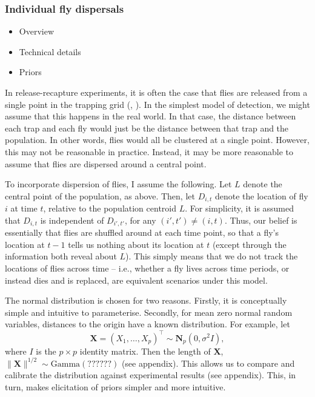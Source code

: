 \documentclass[
]{book}
\providecommand{\tightlist}{%
  \setlength{\itemsep}{0pt}\setlength{\parskip}{0pt}}
\begin{document}
\hypertarget{individual-fly-dispersals}{%
\subsubsection{Individual fly dispersals}\label{individual-fly-dispersals}}

\begin{itemize}
\tightlist
\item
  Overview
\item
  Technical details
\item
  Priors
\end{itemize}

In release-recapture experiments, it is often the case that flies are released from a single point in the trapping grid (\citet{lg2004}, \citet{wong1982}). In the simplest model of detection, we might assume that this happens in the real world. In that case, the distance between each trap and each fly would just be the distance between that trap and the population. In other words, flies would all be clustered at a single point. However, this may not be reasonable in practice. Instead, it may be more reasonable to assume that flies are dispersed around a central point.

To incorporate dispersion of flies, I assume the following. Let \(L\) denote the central point of the population, as above. Then, let \(D_{i, t}\) denote the location of fly \(i\) at time \(t\), relative to the population centroid \(L\). For simplicity, it is assumed that \(D_{i, t}\) is independent of \(D_{i', t'}\), for any \((i', t') \neq (i, t)\). Thus, our belief is essentially that flies are shuffled around at each time point, so that a fly's location at \(t-1\) tells us nothing about its location at \(t\) (except through the information both reveal about \(L\)). This simply means that we do not track the locations of flies across time -- i.e., whether a fly lives across time periods, or instead dies and is replaced, are equivalent scenarios under this model.

The normal distribution is chosen for two reasons. Firstly, it is conceptually simple and intuitive to parameterise. Secondly, for mean zero normal random variables, distances to the origin have a known distribution. For example, let \[\mathbf X = (X_1, \ldots, X_p)^\top \sim \mathbf N_p(0, \sigma^2 I),\] where \(I\) is the \(p \times p\) identity matrix. Then the length of \(\mathbf X\), \(\lVert \mathbf X \rVert^{1/2} \sim \mathrm{Gamma}(??????)\) \citet{unfinished} (see appendix). This allows us to compare and calibrate the distribution against experimental results (see appendix). This, in turn, makes elicitation of priors simpler and more intuitive.
\end{document}
